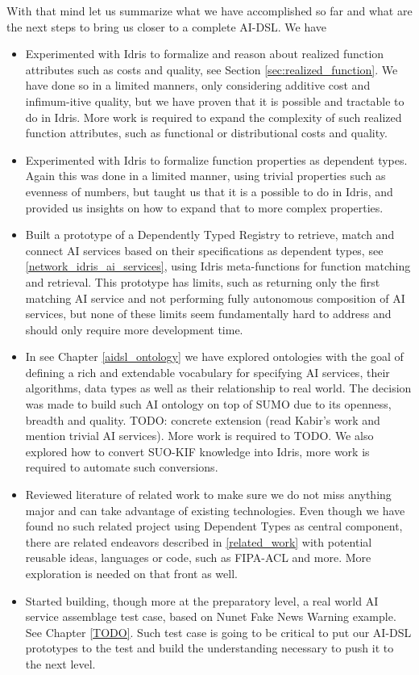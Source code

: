 \documentclass[]{report}
\newcommand{\nil}[2][]{\todo[color=purple,author=nil, #1]{#2}}
\begin{document}
With that mind let us summarize what we have accomplished so far and
what are the next steps to bring us closer to a complete AI-DSL.  We
have
\begin{itemize}
\item Experimented with Idris to formalize and reason about realized
  function attributes such as costs and quality, see Section
  \ref{sec:realized_function}.  We have done so in a limited manners, only
  considering additive cost and infimum-itive quality, but we have
  proven that it is possible and tractable to do in Idris.  More work
  is required to expand the complexity of such realized function
  attributes, such as functional or distributional costs and quality.
\item Experimented with Idris to formalize function properties as
  dependent types\nil{Ref to Sam's work}.  Again this was done in a
  limited manner, using trivial properties such as evenness of
  numbers, but taught us that it is a possible to do in Idris, and
  provided us insights on how to expand that to more complex
  properties.
\item Built a prototype of a Dependently Typed Registry to retrieve,
  match and connect AI services based on their specifications as
  dependent types, see \ref{network_idris_ai_services}, using Idris
  meta-functions for function matching and retrieval.  This prototype
  has limits, such as returning only the first matching AI service and
  not performing fully autonomous composition of AI services, but none
  of these limits seem fundamentally hard to address and should only
  require more development time.
\item In see Chapter \ref{aidsl_ontology} we have explored ontologies
  with the goal of defining a rich and extendable vocabulary for
  specifying AI services, their algorithms, data types as well as
  their relationship to real world.  The decision was made to build
  such AI ontology on top of SUMO due to its openness, breadth and
  quality.  TODO: concrete extension (read Kabir's work and mention
  trivial AI services).  More work is required to TODO.  We also
  explored how to convert SUO-KIF knowledge into Idris, more work is
  required to automate such conversions.
\item Reviewed literature of related work to make sure we do not miss
  anything major and can take advantage of existing technologies.
  Even though we have found no such related project using Dependent
  Types as central component, there are related endeavors described in
  \ref{related_work} with potential reusable ideas, languages or code,
  such as FIPA-ACL and more.  More exploration is needed on that front
  as well.
\item Started building, though more at the preparatory level, a real
  world AI service assemblage test case, based on Nunet Fake News
  Warning example.  See Chapter \ref{TODO}.  Such test case is going
  to be critical to put our AI-DSL prototypes to the test and build
  the understanding necessary to push it to the next level.
\end{itemize}
\end{document}

